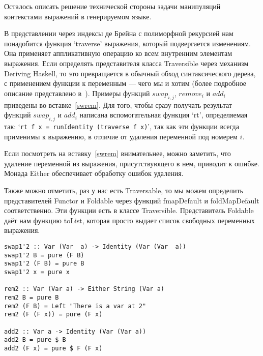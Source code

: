 \hfill

Осталось описать решение технической стороны задачи манипуляций контекстами выражений в генерируемом языке.

В представлении через индексы де Брейна с полиморфной рекурсией нам понадобится функция `traverse' выражения, который подвергается изменениям. Она применяет аппликативную операцию ко всем внутренним элементам выражения. Если определять представителя класса Traversible через механизм Deriving Haskell\cite{deriveFun}, то это превращается в обычный обход синтаксического дерева, с применением функции к переменным --- чего мы и хотим (более подробное описание представлено в~\cite{bound}). Примеры функций $swap_{i,j}$, $remove_i$ и $add_i$ приведены во вставке~\ref{swrem}. Для того, чтобы сразу получать результат функций $swap_{i,j}$ и $add_i$ написана вспомогательная функция `rt', определяемая так: `\lstinline{rt f x = runIdentity (traverse f x)}', так как эти функции всегда применимы к выражению, в отличие от удаления переменной под номерем $i$.

Если посмотреть на вставку~\ref{swrem} внимательнее, можно заметить, что удаление переменной из выражения, присутствующего в нем, приводит к ошибке. Монада Either обеспечивает обработку ошибок удаления.

Также можно отметить, раз у нас есть Traversable, то мы можем определить представителей Functor и Foldable через функций fmapDefault и foldMapDefault соответственно. Эти функции есть в классе Traversible. Представитель Foldable даёт нам функцию toList, которая просто выдает список свободных переменных выражения.

\begin{lstlisting}[label={swrem}, caption={Примеры функций $swap_{i,j}$, $remove_i$ и $add_i$},captionpos=b, frame=single, float, floatplacement=H]
swap1'2 :: Var (Var  a) -> Identity (Var (Var  a))
swap1'2 B = pure (F B)
swap1'2 (F B) = pure B
swap1'2 x = pure x

rem2 :: Var (Var a) -> Either String (Var a)
rem2 B = pure B
rem2 (F B) = Left "There is a var at 2"
rem2 (F (F x)) = pure (F x)

add2 :: Var a -> Identity (Var (Var a))
add2 B = pure $ B
add2 (F x) = pure $ F (F x)
\end{lstlisting}







